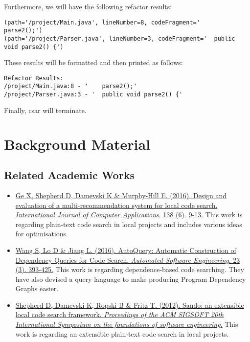\documentclass[12pt, letterpaper]{article}
\begin{document}
Furthermore, we will have the following refactor results:
\begin{lstlisting}
(path='/project/Main.java', lineNumber=8, codeFragment='    parse2();')
(path='/project/Parser.java', lineNumber=3, codeFragment='  public void parse2() {')
\end{lstlisting}

These results will be formatted and then printed as follows:
\begin{lstlisting}
Refactor Results:
/project/Main.java:8 - '    parse2();'
/project/Parser.java:3 - '  public void parse2() {'
\end{lstlisting}

Finally, csar will terminate.

\section{Background Material}
\subsection{Related Academic Works}
\begin{itemize}
    \item \href{http://www.sciencedirect.com.ezproxy.library.qmul.ac.uk/science/article/pii/S1045926X16300970?_rdoc=1&_fmt=high&_origin=gateway&_docanchor=&md5=b8429449ccfc9c30159a5f9aeaa92ffb&ccp=y}{Ge X, Shepherd D, Damevski K \& Murphy-Hill E. (2016). Design and evaluation of a multi-recommendation system for local code search. \textit{International Journal of Computer Applications}. 138 (6). 9-13.}\newline
    This work is regarding plain-text code search in local projects and includes various ideas for optimisations.
    \item \href{https://link-springer-com.ezproxy.library.qmul.ac.uk/article/10.1007%2Fs10515-014-0170-2}{Wang S, Lo D \& Jiang L. (2016). AutoQuery: Automatic Construction of Dependency Queries for Code Search. \textit{Automated Software Engineering}. 23 (3). 393-425.}\newline
    This work is regarding dependence-based code searching.
    They have also devised a query language to make producing Program Dependency Graphs easier.
    \item \href{http://dl.acm.org.ezproxy.library.qmul.ac.uk/citation.cfm?id=2393612}{Shepherd D, Damevski K, Ropski B \& Fritz T. (2012). Sando: an extensible local code search framework. \textit{Proceedings of the ACM SIGSOFT 20th International Symposium on the foundations of software engineering}.}\newline
    This work is regarding an extensible plain-text code search in local projects.
\end{itemize}
\end{document}
